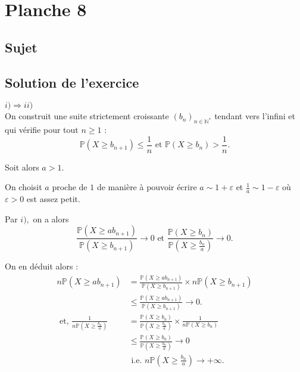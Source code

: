 \chapter{Planche 8}

\section{Sujet}

\section{Solution de l'exercice}

$\boxed{i)\Longrightarrow ii)}$\\

On construit une suite strictement croissante $\displaystyle (b_{n})_{n\in\mathbb{N}^{*}}$ tendant vers l'infini et qui vérifie pour tout $n\geq 1$ : $$\mathbb{P}(X\geq b_{n+1})\leq \frac{1}{n} \mbox{ et }\mathbb{P}(X\geq b_{n})>\frac{1}{n}.$$

Soit alors $a>1.$ 

On choisit $a$ proche de $1$ de manière à pouvoir écrire $\displaystyle a\sim 1+\varepsilon$ et $\displaystyle \frac{1}{a}\sim 1-\varepsilon$ où $\varepsilon>0$ est assez petit.

Par $i),$ on a alors $$ \frac{\mathbb{P}(X\geq ab_{n+1})}{\mathbb{P}(X\geq b_{n+1})}\longrightarrow 0 \mbox{ et } \frac{\mathbb{P}(X\geq b_{n})}{\mathbb{P}(X\geq \frac{b_{n}}{a})}\longrightarrow 0.$$

On en déduit alors :  
\begin{align*}
n\mathbb{P}(X\geq ab_{n+1}) & = \frac{\mathbb{P}(X\geq ab_{n+1})}{\mathbb{P}(X\geq b_{n+1})}\times n\mathbb{P}(X\geq b_{n+1})\\
& \leq \frac{\mathbb{P}(X\geq ab_{n+1})}{\mathbb{P}(X\geq b_{n+1})} \longrightarrow 0.\\
\mbox{ et, } \frac{1}{n\mathbb{P}(X\geq \frac{b_{n}}{a})} & = \frac{\mathbb{P}(X\geq b_{n})}{\mathbb{P}(X\geq \frac{b_{n}}{a})}\times \frac{1}{n\mathbb{P}(X\geq b_{n})}\\
& \leq \frac{\mathbb{P}(X\geq b_{n})}{\mathbb{P}(X\geq \frac{b_{n}}{a})} \longrightarrow 0\\
& \mbox{ i.e. } n\mathbb{P}(X\geq \frac{b_{n}}{a}) \longrightarrow +\infty.
\end{align*}

